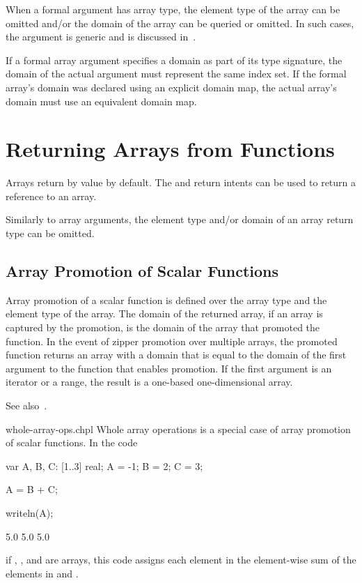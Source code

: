 When a formal argument has array type, the element type of the array
can be omitted and/or the domain of the array can be queried or
omitted.  In such cases, the argument is generic and is discussed
in~.

If a formal array argument specifies a domain as part of its type
signature, the domain of the actual argument must represent the same
index set.  If the formal array's domain was declared using an
explicit domain map, the actual array's domain must use an equivalent
domain map.

\section{Returning Arrays from Functions}
\label{Returning_Arrays_from_Functions}

Arrays return by value by default. The  and 
return intents can be used to return a reference to an array.

Similarly to array arguments, the element type and/or domain of an array return
type can be omitted.

\subsection{Array Promotion of Scalar Functions}
\label{Array_Promotion_of_Scalar_Functions}

Array promotion of a scalar function is defined over the array type
and the element type of the array.  The domain of the returned array,
if an array is captured by the promotion, is the domain of the array
that promoted the function.  In the event of zipper promotion over
multiple arrays, the promoted function returns an array with a domain
that is equal to the domain of the first argument to the function that
enables promotion.  If the first argument is an iterator or a range,
the result is a one-based one-dimensional array.

See also~.

\begin{chapelexample}{whole-array-ops.chpl}
Whole array operations is a special case of array promotion of scalar
functions.  In the code
\begin{chapelpre}
var A, B, C: [1..3] real;
A = -1;
B = 2;
C = 3;
\end{chapelpre}
\begin{chapel}
A = B + C;
\end{chapel}
\begin{chapelpost}
writeln(A);
\end{chapelpost}
\begin{chapeloutput}
5.0 5.0 5.0
\end{chapeloutput}
if , , and  are arrays, this code assigns each
element in  the element-wise sum of the elements in 
and .
\end{chapelexample}

